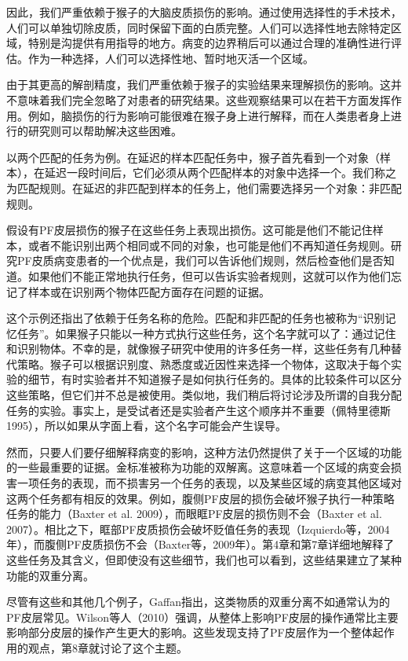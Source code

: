 \par
因此，我们严重依赖于猴子的大脑皮质损伤的影响。通过使用选择性的手术技术，人们可以单独切除皮质，同时保留下面的白质完整。人们可以选择性地去除特定区域，特别是沟提供有用指导的地方。病变的边界稍后可以通过合理的准确性进行评估。作为一种选择，人们可以选择性地、暂时地灭活一个区域。
\par
由于其更高的解剖精度，我们严重依赖于猴子的实验结果来理解损伤的影响。这并不意味着我们完全忽略了对患者的研究结果。这些观察结果可以在若干方面发挥作用。例如，脑损伤的行为影响可能很难在猴子身上进行解释，而在人类患者身上进行的研究则可以帮助解决这些困难。
\par
以两个匹配的任务为例。在延迟的样本匹配任务中，猴子首先看到一个对象（样本），在延迟一段时间后，它们必须从两个匹配样本的对象中选择一个。我们称之为匹配规则。在延迟的非匹配到样本的任务上，他们需要选择另一个对象：非匹配规则。
\par
假设有PF皮层损伤的猴子在这些任务上表现出损伤。这可能是他们不能记住样本，或者不能识别出两个相同或不同的对象，也可能是他们不再知道任务规则。研究PF皮质病变患者的一个优点是，我们可以告诉他们规则，然后检查他们是否知道。如果他们不能正常地执行任务，但可以告诉实验者规则，这就可以作为他们忘记了样本或在识别两个物体匹配方面存在问题的证据。
\par
这个示例还指出了依赖于任务名称的危险。匹配和非匹配的任务也被称为“识别记忆任务”。如果猴子只能以一种方式执行这些任务，这个名字就可以了：通过记住和识别物体。不幸的是，就像猴子研究中使用的许多任务一样，这些任务有几种替代策略。猴子可以根据识别度、熟悉度或近因性来选择一个物体，这取决于每个实验的细节，有时实验者并不知道猴子是如何执行任务的。具体的比较条件可以区分这些策略，但它们并不总是被使用。类似地，我们稍后将讨论涉及所谓的自我分配任务的实验。事实上，是受试者还是实验者产生这个顺序并不重要（佩特里德斯1995），所以如果从字面上看，这个名字可能会产生误导。
\par
然而，只要人们要仔细解释病变的影响，这种方法仍然提供了关于一个区域的功能的一些最重要的证据。金标准被称为功能的双解离。这意味着一个区域的病变会损害一项任务的表现，而不损害另一个任务的表现，以及某些区域的病变其他区域对这两个任务都有相反的效果。例如，腹侧PF皮层的损伤会破坏猴子执行一种策略任务的能力（Baxter et al. 2009），而眼眶PF皮层的损伤则不会（Baxter et al. 2007）。相比之下，眶部PF皮质损伤会破坏贬值任务的表现（Izquierdo等，2004年），而腹侧PF皮质损伤不会（Baxter等，2009年）。第4章和第7章详细地解释了这些任务及其含义，但即使没有这些细节，我们也可以看到，这些结果建立了某种功能的双重分离。
\par
尽管有这些和其他几个例子，Gaffan指出，这类物质的双重分离不如通常认为的PF皮层常见。Wilson等人（2010）强调，从整体上影响PF皮层的操作通常比主要影响部分皮层的操作产生更大的影响。这些发现支持了PF皮层作为一个整体起作用的观点，第8章就讨论了这个主题。
